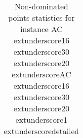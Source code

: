 \begin{table}
\caption{Non-dominated points statistics for instance AC	extunderscore16	extunderscore30	extunderscore20	extunderscoreAC	extunderscore16	extunderscore30	extunderscore20	extunderscore1	extunderscoredetailed}
\label{tab:stats/AC_16_30_20_AC_16_30_20_1_detailed}
\begin{tabular}{}
\toprule
\midrule
\bottomrule
\end{tabular}
\end{table}
